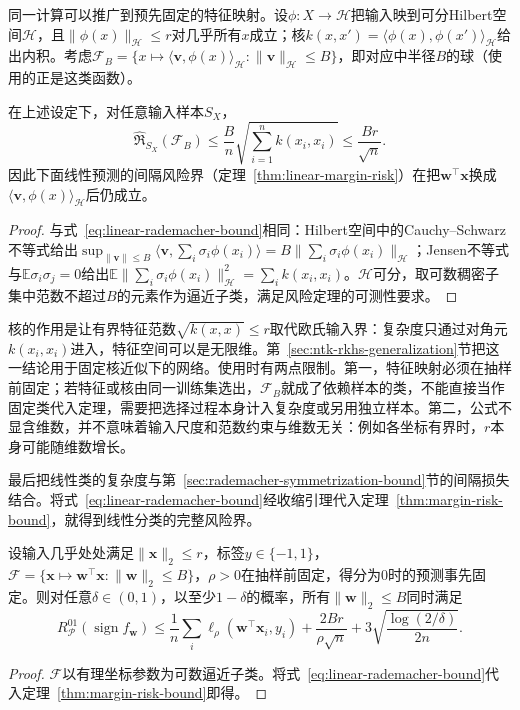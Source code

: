 同一计算可以推广到预先固定的特征映射。设$\phi:X\to\mathcal H$把输入映到可分Hilbert空间$\mathcal H$，且$\|\phi(x)\|_{\mathcal H}\leq r$对几乎所有$x$成立；核$k(x,x')=\langle\phi(x),\phi(x')\rangle_{\mathcal H}$给出内积。考虑$\mathcal F_B=\{x\mapsto\langle\bm v,\phi(x)\rangle_{\mathcal H}:\|\bm v\|_{\mathcal H}\leq B\}$，即对应中半径$B$的球（使用的正是这类函数）。

\begin{theorem}[固定特征映射的Rademacher复杂度]
\label{thm:kernel-rademacher}
在上述设定下，对任意输入样本$S_X$，
\[
 \widehat{\mathfrak R}_{S_X}(\mathcal F_B)
 \leq\frac Bn\sqrt{\sum_{i=1}^nk(x_i,x_i)}
 \leq\frac{Br}{\sqrt n}.
\]
因此下面线性预测的间隔风险界（定理~\ref{thm:linear-margin-risk}）在把$\bm w^\top\bm x$换成$\langle\bm v,\phi(x)\rangle_{\mathcal H}$后仍成立。
\end{theorem}
\begin{proof}
与式~\eqref{eq:linear-rademacher-bound}相同：Hilbert空间中的Cauchy--Schwarz不等式给出$\sup_{\|\bm v\|\leq B}\langle\bm v,\sum_i\sigma_i\phi(x_i)\rangle=B\|\sum_i\sigma_i\phi(x_i)\|_{\mathcal H}$；Jensen不等式与$\mathbb E\sigma_i\sigma_j=0$给出$\mathbb E\|\sum_i\sigma_i\phi(x_i)\|^2_{\mathcal H}=\sum_ik(x_i,x_i)$。$\mathcal H$可分，取可数稠密子集中范数不超过$B$的元素作为逼近子类，满足风险定理的可测性要求。
\end{proof}

核的作用是让有界特征范数$\sqrt{k(x,x)}\leq r$取代欧氏输入界：复杂度只通过对角元$k(x_i,x_i)$进入，特征空间可以是无限维。第~\ref{sec:ntk-rkhs-generalization}节把这一结论用于固定核近似下的网络。使用时有两点限制。第一，特征映射必须在抽样前固定；若特征或核由同一训练集选出，$\mathcal F_B$就成了依赖样本的类，不能直接当作固定类代入定理，需要把选择过程本身计入复杂度或另用独立样本。第二，公式不显含维数，并不意味着输入尺度和范数约束与维数无关：例如各坐标有界时，$r$本身可能随维数增长。

最后把线性类的复杂度与第~\ref{sec:rademacher-symmetrization-bound}节的间隔损失结合。将式~\eqref{eq:linear-rademacher-bound}经收缩引理代入定理~\ref{thm:margin-risk-bound}，就得到线性分类的完整风险界。

\begin{theorem}[线性预测的间隔风险界]
\label{thm:linear-margin-risk}
设输入几乎处处满足$\|\bm x\|_2\leq r$，标签$y\in\{-1,1\}$，$\mathcal F=\{\bm x\mapsto\bm w^\top\bm x:\|\bm w\|_2\leq B\}$，$\rho>0$在抽样前固定，得分为0时的预测事先固定。则对任意$\delta\in(0,1)$，以至少$1-\delta$的概率，所有$\|\bm w\|_2\leq B$同时满足
\begin{equation}
 R_{\mathcal P}^{01}(\operatorname{sign}f_{\bm w})
 \leq\frac1n\sum_i\ell_\rho(\bm w^\top\bm x_i,y_i)
 +\frac{2Br}{\rho\sqrt n}
 +3\sqrt{\frac{\log(2/\delta)}{2n}}.
 \label{eq:rademacher-margin-risk}
\end{equation}
\end{theorem}
\begin{proof}
$\mathcal F$以有理坐标参数为可数逼近子类。将式~\eqref{eq:linear-rademacher-bound}代入定理~\ref{thm:margin-risk-bound}即得。
\end{proof}

